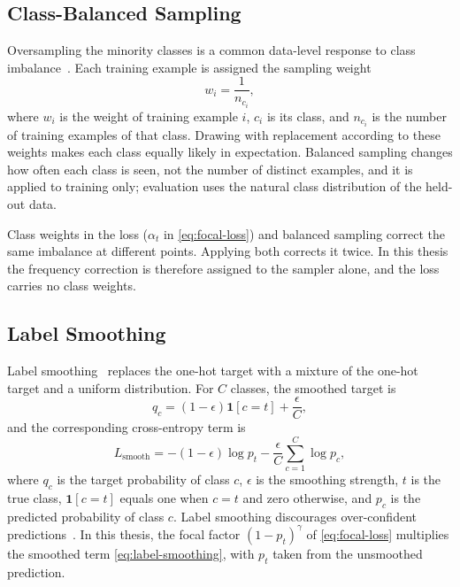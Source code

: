 \subsection{Class-Balanced Sampling}
\label{sec:balanced-sampling}
\label{sec:combining-both}

Oversampling the minority classes is a common data-level response to class imbalance~\cite{he2009,buda2018}. Each training example is assigned the sampling weight
\begin{equation}
	w_i=\frac{1}{n_{c_i}},
	\label{eq:sampler-weight}
\end{equation}
where $w_i$ is the weight of training example $i$, $c_i$ is its class, and $n_{c_i}$ is the number of training examples of that class. Drawing with replacement according to these weights makes each class equally likely in expectation. Balanced sampling changes how often each class is seen, not the number of distinct examples, and it is applied to training only; evaluation uses the natural class distribution of the held-out data.

Class weights in the loss ($\alpha_t$ in \eqref{eq:focal-loss}) and balanced sampling correct the same imbalance at different points. Applying both corrects it twice. In this thesis the frequency correction is therefore assigned to the sampler alone, and the loss carries no class weights.

\subsection{Label Smoothing}
\label{sec:label-smoothing}

Label smoothing~\cite{szegedy2016} replaces the one-hot target with a mixture of the one-hot target and a uniform distribution. For $C$ classes, the smoothed target is
\begin{equation}
	q_c=(1-\epsilon)\mathbf{1}[c=t]+\frac{\epsilon}{C},
	\label{eq:smoothed-target}
\end{equation}
and the corresponding cross-entropy term is
\begin{equation}
	L_{\mathrm{smooth}}
	=-(1-\epsilon)\log p_t
	-\frac{\epsilon}{C}\sum_{c=1}^{C}\log p_c,
	\label{eq:label-smoothing}
\end{equation}
where $q_c$ is the target probability of class $c$, $\epsilon$ is the smoothing strength, $t$ is the true class, $\mathbf{1}[c=t]$ equals one when $c=t$ and zero otherwise, and $p_c$ is the predicted probability of class $c$. Label smoothing discourages over-confident predictions~\cite{szegedy2016}. In this thesis, the focal factor $(1-p_t)^\gamma$ of \eqref{eq:focal-loss} multiplies the smoothed term \eqref{eq:label-smoothing}, with $p_t$ taken from the unsmoothed prediction.

